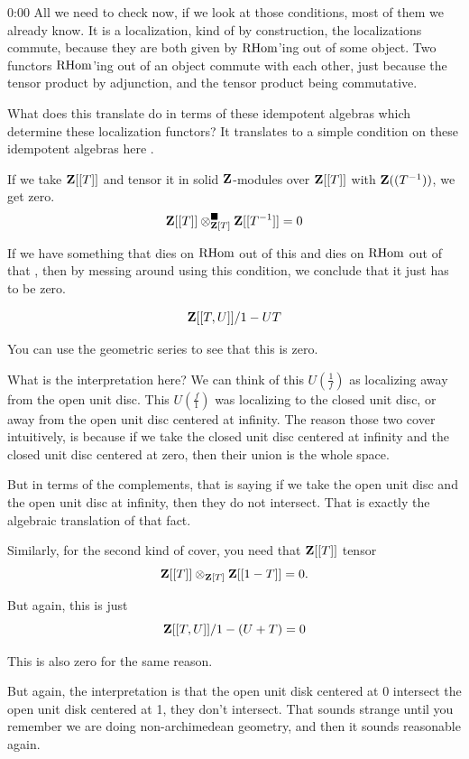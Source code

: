 \begin{unfinished}{0:00}
All we need to check now, if we look at those conditions, most of them we already know. It is a localization, kind of by construction, the localizations commute, because they are both given by $\operatorname{RHom}$'ing out of some object. 
Two functors $\operatorname{RHom}$'ing out of an object commute with each other, just because the tensor product by adjunction, and the tensor product being commutative.

What does this  translate do in terms of these idempotent algebras which determine these localization functors? It translates to a simple condition on these idempotent algebras here . 

If we take $\mathbf Z[[T]]$ and tensor it in solid $\mathbf Z$-modules over $\mathbf Z[[T]]$ with $\mathbf Z((T^{-1}))$, we get zero.
\[
\mathbf Z[[T]] \otimes^\blacksquare_{\mathbf Z[T]} \mathbf Z[[T^{-1}]] = 0
\]

If we have something that dies on $\operatorname{RHom}$ out of this  and dies on $\operatorname{RHom}$ out of that , then by messing around using this  condition, we conclude that it just has to be zero.

\[
\mathbf Z[[T, U]] / 1 - UT
\]

You can use the geometric series to see that this is zero.

What is the interpretation here? We can think of this $U(\frac{1}{f})$  as localizing away from the open unit disc. This $U(\frac{f}{1})$ was localizing to the closed unit disc, or away from the open unit disc centered at infinity.
The reason those two cover intuitively, is because if we take the closed unit disc centered at infinity and the closed unit disc centered at zero, then their union is the whole space. 

But in terms of the complements, that is saying if we take the open unit disc and the open unit disc at infinity, then they do not intersect. That is exactly the algebraic translation of that fact.

Similarly, for the second kind of cover, you need that $\mathbf Z[[T]]$ tensor
\[
\mathbf Z[[T]] \otimes_{\mathbf Z[T]} \mathbf Z[[1-T]] = 0.
\]

But again, this is just
\[
\mathbf Z[[T, U]] / 1 - (U+T) = 0
\]

This is also zero for the same reason.

But again, the interpretation is that the open unit disk centered at 0 intersect the open unit disk centered at 1, they don't intersect. That sounds strange until you remember we are doing non-archimedean geometry, and then it sounds reasonable again.


\end{unfinished}
